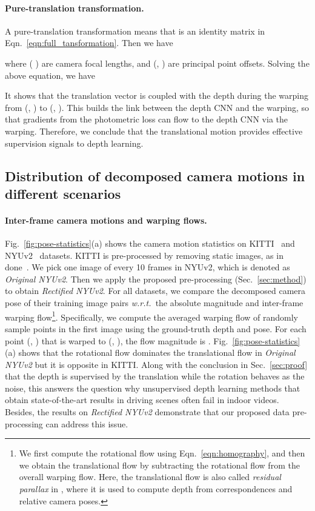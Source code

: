 \documentclass{article}
\newcommand{\figref}[1]{Fig.~\ref{#1}}
\newcommand{\equref}[1]{Eqn.~\ref{#1}}
\newcommand{\secref}[1]{Sec.~\ref{#1}}
\def\wrt{\emph{w.r.t.~}}
\begin{document}
\paragraph{Pure-translation transformation.}
A pure-translation transformation means that  is an identity matrix in \equref{eqn:full_tansformation}.
Then we have

where ( ) are camera focal lengths, and (, ) are principal point offsets.
Solving the above equation, we have

It shows that the translation vector  is coupled with the depth  during the warping from (, ) to (, ).
This builds the link between the depth CNN and the warping,
so that gradients from the photometric loss can flow to the depth CNN via the warping.
Therefore, we conclude that the translational motion provides effective supervision signals to depth learning.

\subsection{Distribution of decomposed camera motions in different scenarios}\label{sec:pose-effects}

\paragraph{Inter-frame camera motions and warping flows.}

\figref{fig:pose-statistics}(a) shows the camera motion statistics on KITTI~\cite{Geiger2013IJRR} and NYUv2~\cite{silberman2012indoor} datasets.
KITTI is pre-processed by removing static images, as in done~\cite{zhou2017unsupervised, bian2019depth}.
We pick one image of every 10 frames in NYUv2, which is denoted as \emph{Original NYUv2}.
Then we apply the proposed pre-processing (\secref{sec:method}) to obtain \emph{Rectified NYUv2}.
For all datasets, we compare the decomposed camera pose of their training image pairs \wrt the absolute magnitude and inter-frame warping flow\footnote{We first compute the rotational flow using \equref{eqn:homography}, and then we obtain the translational flow by subtracting the rotational flow from the overall warping flow. Here, the translational flow is also called \emph{residual parallax} in \cite{Li2020MannequinChallengeLT}, where it is used to compute depth from correspondences and relative camera poses.}.
Specifically, we compute the averaged warping flow of randomly sample points in the first image using the ground-truth depth and pose.
For each point (, ) that is warped to (, ), the flow magnitude is .
\figref{fig:pose-statistics}(a) shows that the rotational flow dominates the translational flow in \emph{Original NYUv2} but it is opposite in KITTI.
Along with the conclusion in \secref{sec:proof} that the depth is supervised by the translation while the rotation behaves as the noise,
this answers the question why unsupervised depth learning methods that obtain state-of-the-art results in driving scenes often fail in indoor videos.
Besides, the results on \emph{Rectified NYUv2} demonstrate that our proposed data pre-processing can address this issue.
\end{document}
